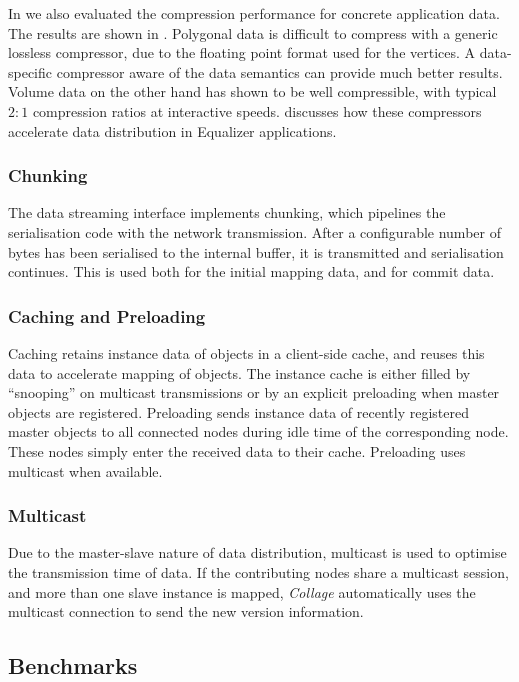 In \cite{ESP:18} we also evaluated the compression performance for concrete
application data. The results are shown in . Polygonal
data is difficult to compress with a generic lossless compressor, due to the
floating point format used for the vertices. A data-specific compressor aware
of the data semantics can provide much better results. Volume data on the other
hand has shown to be well compressible, with typical $2:1$ compression ratios
at interactive speeds.  discusses how these compressors
accelerate data distribution in Equalizer applications.

\subsubsection{Chunking}

The data streaming interface implements chunking, which pipelines the
serialisation code with the network transmission. After a configurable number of
bytes has been serialised to the internal buffer, it is transmitted and
serialisation continues. This is used both for the initial mapping data, and for
commit data.

\subsubsection{Caching and Preloading}

Caching retains instance data of objects in a client-side cache, and reuses
this data to accelerate mapping of objects. The instance cache is either filled
by ``snooping'' on multicast transmissions or by an explicit preloading when
master objects are registered. Preloading sends instance data of recently
registered master objects to all connected nodes during idle time of the
corresponding node. These nodes simply enter the received data to their cache.
Preloading uses multicast when available.

\subsubsection{Multicast}

Due to the master-slave nature of data distribution, multicast is used to
optimise the transmission time of data. If the contributing nodes share a
multicast session, and more than one slave instance is mapped, {\em Collage}
automatically uses the multicast connection to send the new version
information.

\subsection{Benchmarks}\label{sObjectBench}

